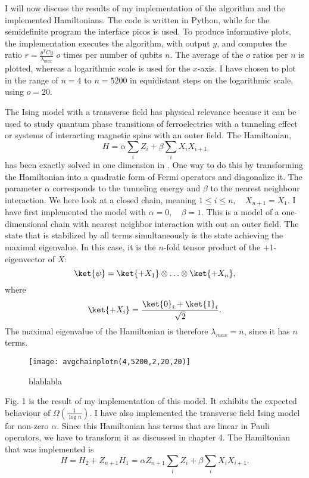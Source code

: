 I will now discuss the results of my implementation of the algorithm and the implemented Hamiltonians.
The code is written in Python, while for the semidefinite program the interface picos is used.
To produce informative plots, the implementation executes the algorithm, with output $y$, and computes the ratio $r=\frac{y^{T}Cy}{\lambda_{max}}$ $o$ times per number of qubits $n$.
The average of the $o$ ratios per $n$ is plotted, whereas a logarithmic scale is used for the $x$-axis.
I have chosen to plot in the range of $n=4$ to $n=5200$ in equidistant steps on the logarithmic scale, using $o=20$. 

The Ising model with a transverse field has physical relevance because it can be used to study quantum phase transitions of ferroelectrics with a tunneling effect or systems of interacting magnetic spins with an outer field.
The Hamiltonian,
\[
H=\alpha \sum_{i} Z_i + \beta \sum_{i} X_iX_{i+1}
\]
has been exactly solved in one dimension in \cite{pfeuty70}.
One way to do this by transforming the Hamiltonian into a quadratic form of Fermi operators and diagonalize it. 
The parameter $\alpha$ corresponds to the tunneling energy and $\beta$ to the nearest neighbour interaction.
We here look at a closed chain, meaning $1\le i \le n, \quad X_{n+1}=X_{1}$.
I have first implemented the model with $\alpha =0, \quad \beta =1$.
This is a model of a one-dimensional chain with nearest neighbor interaction with out an outer field.
The state that is stabilized by all terms simultaneously is the state achieving the maximal eigenvalue.
In this case, it is the $n$-fold tensor product of the $+1$-eigenvector of $X$: \[
\ket{\psi}= \ket{+X_1}\otimes\ldots\otimes\ket{+X_n}
,\] where \[
\ket{+X_i}= \frac{\ket{0}_i+\ket{1}_i}{\sqrt{2}}
.\]
The maximal eigenvalue of the Hamiltonian is therefore $\lambda_{max}=n$, since it has $n$ terms.
\begin{figure}[H]
	\centering
	\texttt{[image: avgchainplotn(4,5200,2,20,20)]}
	\caption{blablabla}
	\label{fig:1}
\end{figure}
Fig. 1 is the result of my implementation of this model.
It exhibits the expected behaviour of $\Omega(\frac{1}{\log{}n})$.
I have also implemented the transverse field Ising model for non-zero $\alpha$.
Since this Hamiltonian has terms that are linear in Pauli operators, we have to transform it as discussed in chapter 4.
The Hamiltonian that was implemented is \[
H = H_2 + Z_{n+1}H_1 =\alpha Z_{n+1}\sum_{i} Z_i + \beta \sum_{i} X_iX_{i+1}
.\]
